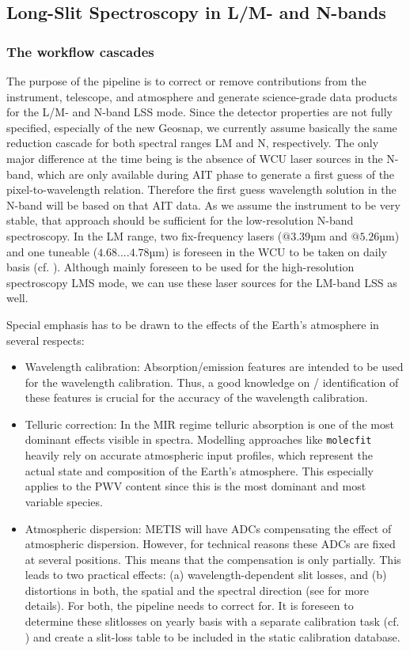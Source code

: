 \subsection{Long-Slit Spectroscopy in L/M- and N-bands}\label{lss:overview}
\subsubsection{The workflow cascades}\label{lss:cascade_overview}
The purpose of the pipeline is to correct or remove contributions from
the instrument, telescope, and atmosphere and generate science-grade
data products for the L/M- and N-band \ac{LSS}
mode. Since the detector properties are not fully specified, especially of the new Geosnap, we currently assume
basically the same reduction cascade for both spectral ranges LM and
N, respectively. The only major difference at the time being is the absence of \ac{WCU} laser sources in the N-band, which are only available during \ac{AIT} phase to generate a first guess of the pixel-to-wavelength relation. Therefore the first guess wavelength solution in the N-band will be based on that \ac{AIT} data. As we assume the instrument to be very stable, that approach should be sufficient for the low-resolution N-band spectroscopy. In the LM range, two fix-frequency lasers ($@3.39$µm and $@5.26$µm) and one tuneable ($4.68....4.78$µm) is foreseen in the \ac{WCU} to be taken on daily basis (cf. \cite{METIS-calibration_plan}). Although mainly foreseen to be used for the high-resolution spectroscopy \ac{LMS} mode, we can use these laser sources for the LM-band \ac{LSS} as well.

Special emphasis has to be drawn to the effects of the Earth's
atmosphere in several respects:
\begin{itemize}
\item Wavelength calibration: Absorption/emission features are intended to be
  used for the wavelength calibration. Thus, a good knowledge on /
  identification of these features is crucial for the accuracy of the
  wavelength calibration.
\item Telluric correction: In the MIR regime telluric absorption is
  one of the most dominant effects visible in spectra. Modelling
  approaches like \texttt{molecfit} heavily rely on accurate
  atmospheric input profiles, which represent the actual state and
  composition of the Earth's atmosphere. This especially applies to
  the \ac{PWV} content since this is the most
  dominant and most variable species.
\item Atmospheric dispersion: \ac{METIS} will have \ac{ADC}s compensating the
  effect of atmospheric dispersion. However, for technical reasons
  these ADCs are fixed at several positions. This means that the
  compensation is only partially. This leads to two practical effects:
  (a) wavelength-dependent slit losses, and (b) distortions in both,
  the spatial and the spectral direction (see \cite{METIS-ADC_study}
  for more details). For both, the pipeline needs to correct
  for. It is foreseen to determine these slitlosses on yearly basis with a separate calibration task (cf. \cite{METIS-calibration_plan}) and create a slit-loss table to be included in the static calibration database.
\end{itemize}

